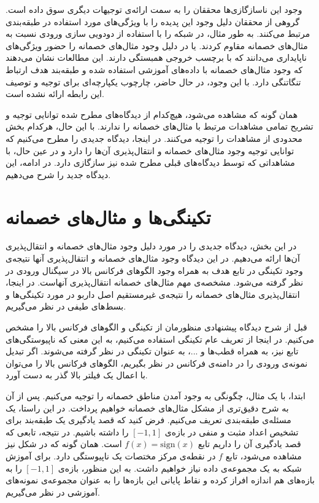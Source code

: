 \documentclass[12pt,onecolumn,a4paper]{article}
\begin{document}
وجود این ناسازگازی‌ها محققان را به سمت ارائه‌ی توجیهات دیگری سوق داده است. گروهی از محققان دلیل وجود این پدیده را با ویژگی‌های مورد استفاده در طبقه‌بندی مرتبط می‌کنند. به طور مثال، در \cite{eykholt2019robust} شبکه را با استفاده از دودویی سازی ورودی نسبت به مثال‌های خصمانه مقاوم کردند. یا در \cite{ilyas2019adversarial} دلیل وجود مثال‌های خصمانه را حضور ویژگی‌های ناپایداری می‌دانند که با برچسب خروجی همبستگی دارند. این مطالعات نشان می‌دهند که وجود مثال‌های خصمانه با داده‌های آموزشی استفاده شده و طبقه‌بند هدف ارتباط تنگاتنگی دارد. با این وجود، در حال حاضر، چارچوب یکپارچه‌ای برای توجیه و توصیف این رابطه ارائه نشده است.

همان گونه که مشاهده می‌شود، هیچ‌کدام از دیدگاه‌های مطرح شده توانایی توجیه و تشریح تمامی مشاهدات مرتبط با مثال‌های خصمانه را ندارند. با این حال، هرکدام بخش محدودی از مشاهدات را توجیه می‌کنند. در اینجا، دیدگاه جدیدی را مطرح می‌کنیم که توانایی توجیه وجود مثال‌های خصمانه و انتقال‌پذیری آن‌ها را دارد و  در عین حال، با مشاهداتی که توسط دیدگاه‌های قبلی مطرح شده نیز سازگازی دارد. در ادامه، این دیدگاه جدید را شرح می‌دهیم.

\section{تکینگی‌ها و مثال‌های خصمانه}
در این بخش، دیدگاه جدیدی را در مورد دلیل وجود مثال‌های خصمانه و انتقال‌پذیری آن‌ها ارائه می‌دهیم. در این دیدگاه وجود مثال‌های خصمانه و انتقال‌پذیری آنها نتیجه‌ی وجود تکینگی در تابع هدف به همراه وجود الگوهای فرکانس بالا در سیگنال ورودی در نظر گرفته می‌شود. مشخصه‌ی مهم مثال‌های خصمانه انتقال‌پذیری آنهاست. در اینجا، انتقال‌پذیری مثال‌های خصمانه را نتیجه‌ی غیرمستقیم اصل داربو در مورد تکینگی‌ها و بسط‌های طیفی در نظر می‌گیریم.

قبل از شرح دیدگاه پیشنهادی منظورمان از تکینگی و الگوهای فرکانس بالا را مشخص می‌کنیم. در اینجا از تعریف عام تکینگی استفاده می‌کنیم، به این معنی که ناپیوستگی‌های تابع نیز، به همراه قطب‌ها و ...، به عنوان تکینگی  در نظر گرفته می‌شوند. اگر تبدیل نمونه‌ی ورودی را در دامنه‌ی فرکانس در نظر بگیریم، الگوهای فرکانس بالا را می‌توان با اعمال یک  فیلتر بالا گذر به دست آورد.

ابتدا، با یک مثال، چگونگی به وجود آمدن مناطق خصمانه را توجیه می‌کنیم. پس از آن به شرح دقیق‌تری از مشکل مثال‌های خصمانه خواهیم پرداخت. در این راستا، یک مسئله‌ی طبقه‌بندی تعریف می‌کنیم. فرض کنید که قصد یادگیری یک طبقه‌بند برای تشخیص اعداد مثبت و منفی در بازه‌ی 
$[-1,1]$ 
را داشته باشیم. در نتیجه، تابعی که قصد یادگیری آن را داریم تابع 
$f(x)=\mathrm{sign}(x)$ 
است. همان گونه که در شکل نیز مشاهده می‌شود، تابع 
$f$ 
در نقطه‌ی مرکز مختصات یک ناپیوستگی دارد. برای آموزش شبکه به یک مجموعه‌ی داده نیاز خواهیم داشت. به این منظور، بازه‌ی 
$[-1,1]$ 
را به بازه‌های هم اندازه افراز کرده و نقاط پایانی این بازه‌ها را به عنوان مجموعه‌ی نمونه‌های آموزشی در نظر می‌گیریم.
\end{document}
